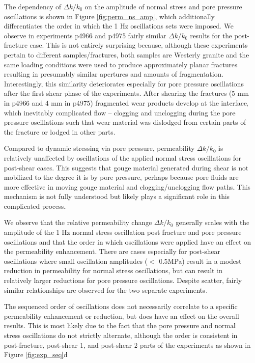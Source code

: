 \documentclass[draft]{agujournal2019}
\begin{document}
The dependency of $ \Delta k/k_0 $ on the amplitude of normal stress and pore pressure oscillations is shown in Figure \ref{fig:perm_ns_amp}, which additionally differentiates the order in which the 1 Hz oscillations sets were imposed. We observe in experiments p4966 and p4975 fairly similar $ \Delta k/k_0 $ results for the post-fracture case. This is not entirely surprising because, although these experiments pertain to different samples/fractures, both samples are Westerly granite and the same loading conditions were used to produce approximately planar fractures resulting in presumably similar apertures and amounts of fragmentation. Interestingly, this similarity deteriorates especially for pore pressure oscillations after the first shear phase of the experiments. After shearing the fractures (5 mm in p4966 and 4 mm in p4975) fragmented wear products develop at the interface, which inevitably complicated flow -- clogging and unclogging during the pore pressure oscillations such that wear material was dislodged from certain parts of the fracture or lodged in other parts.

Compared to dynamic stressing via pore pressure, permeability $ \Delta k/k_0 $ is relatively unaffected by oscillations of the applied normal stress oscillations for post-shear cases. This suggests that gouge material generated during shear is not mobilized to the degree it is by pore pressure, perhaps because pore fluids are more effective in moving gouge material and clogging/unclogging flow paths. This mechanism is not fully understood but likely plays a significant role in this complicated process.

We observe that the relative permeability change $ \Delta k/k_0 $ generally scales with the amplitude of the 1 Hz normal stress oscillation post fracture and pore pressure oscillations and that the order in which oscillations were applied have an effect on the permeability enhancement. There are cases especially for post-shear oscillations where small oscillation amplitudes ($< $ 0.5MPa) result in a modest reduction in permeability for normal stress oscillations, but can result in relatively larger reductions for pore pressure oscillations. Despite scatter, fairly similar relationships are observed for the two separate experiments.

The sequenced order of oscillations does not necessarily correlate to a specific permeability enhancement or reduction, but does have an effect on the overall results. This is most likely due to the fact that the pore pressure and normal stress oscillations do not strictly alternate, although the order is consistent in post-fracture, post-shear 1, and post-shear 2 parts of the experiments as shown in Figure \ref{fig:exp_seq}d 
\end{document}
